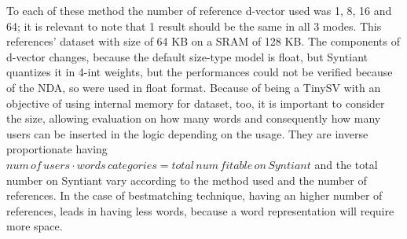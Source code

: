 To each of these method the number of reference d-vector used was 1, 8, 16 and 64; it is relevant to note that 1 result should be the same in all 3 modes. This references' dataset with size of 64 KB on a SRAM of 128 KB. The components of d-vector changes, because the default size-type model is float, but Syntiant quantizes it in 4-int weights, but the performances could not be verified because of the NDA, so were used in float format.\newline\newline
Because of being a TinySV with an objective of using internal memory for dataset, too, it is important to consider the size, allowing evaluation on how many words and consequently how many users can be inserted in the logic depending on the usage. They are inverse proportionate having $num\,of\,users\cdot words\,categories=total\,num\,fitable\,on\,Syntiant$ and the total number on Syntiant vary according to the method used and the number of references. In the case of bestmatching technique, having an higher number of references, leads in having less words, because a word representation will require more space.\newline
